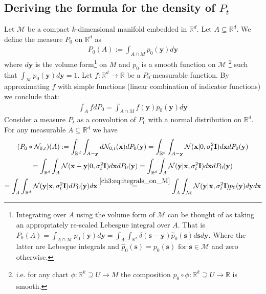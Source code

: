 \subsection*{Deriving the formula for the density of $P_t$}
Let $\mathcal{M}$ be a compact $k$-dimensional manifold embedded in $\mathbb{R}^d$.
Let $A \subseteq \mathbb{R}^d$. We define the measure $P_0$ on $\mathbb{R}^d$ as
\begin{gather}
    P_0(A) := \int_{A \cap M} p_0(\textbf{y}) d\textbf{y}
\end{gather}
where $d\textbf{y}$ is the volume form\footnote{Integrating over $A$ using the volume form of $\mathcal{M}$ can be thought of as taking an appropriately re-scaled Lebesgue integral over $A$. That is $P_0(A) = \int_{A \cap \mathcal{M}} p_0(\textbf{y})d\textbf{y} = \int_A \int_{\mathbb{R}^d} \delta (\textbf{s}-\textbf{y})\hat{p}_0(\textbf{s})d\textbf{s} d\textbf{y}$. Where the latter are Lebesgue integrals and $\hat{p}_0(\textbf{s}) = p_0(\textbf{s}) \text{ for } \textbf{s}\in\mathcal{M}$ and zero otherwise.} on $M$ and $p_0$ is a smooth function on $\mathcal{M}$ \footnote{i.e. for any chart $\phi: \mathbb{R}^k \supseteq U \xrightarrow[]{} M$ the composition $p_0 \circ \phi: \mathbb{R}^k \supseteq U \xrightarrow[]{} \mathbb{R}$ is smooth.} such that $\int_\mathcal{M} p_0(\textbf{y}) d\textbf{y} = 1$. Let $f : \mathbb{R}^d \rightarrow \mathbb{R}$ be a $P_0$-measurable function. By approximating $f$ with simple functions (linear combination of indicator functions) we conclude that:
\begin{gather}
\label{ch3:eq:itegrals_on_M}
    \int_A f dP_0 = \int_{A \cap M} f(\textbf{y}) p_0(\textbf{y}) d\textbf{y}
\end{gather}
Consider a measure $P_t$ as a convolution of $P_0$ with a normal distribution on $\mathbb{R}^d$. For any measurable  $A \subseteq \mathbb{R}^d$ we have
\begin{gather*}
    (P_0 \ast  \mathcal{N}_{0, t})(A) := \int_{\mathbb{R}^d}\int_{A-\textbf{y}}d\mathcal{N}_{0, t}(\textbf{x})dP_0(\textbf{y}) = \int_{\mathbb{R}^d}\int_{A-\textbf{y}}\mathcal{N}(\textbf{x} | 0, \sigma^2_t\textbf{I})d\textbf{x} dP_0(\textbf{y}) \\
    =  \int_{\mathbb{R}^d}\int_{A}\mathcal{N}(\textbf{x}-\textbf{y} | 0, \sigma^2_t\textbf{I})d\textbf{x} dP_0(\textbf{y}) =  \int_{\mathbb{R}^d}\int_{A}\mathcal{N}(\textbf{y} | \textbf{x}, \sigma^2_t\textbf{I})d\textbf{x} dP_0(\textbf{y}) \\
    = \int_{A} \int_{\mathbb{R}^d} \mathcal{N}(\textbf{y} | \textbf{x}, \sigma^2_t\textbf{I})dP_0(\textbf{y}) d\textbf{x} \overset{\eqref{ch3:eq:itegrals_on_M}}{=} \int_{A} \int_\mathcal{M} \mathcal{N}(\textbf{y} | \textbf{x}, \sigma^2_t\textbf{I}) p_0(\textbf{y}) d\textbf{y} d\textbf{x}
\end{gather*}
